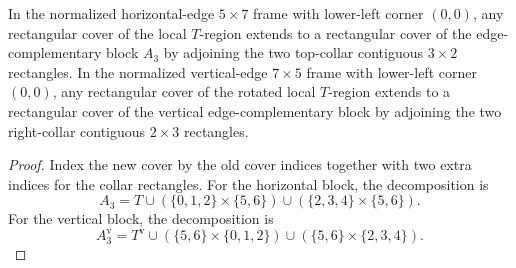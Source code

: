\begin{lemma}%
    \label{lem:peps_normalSquareEdgeComplementRegion_coverOfT}
    \leanok
    In the normalized horizontal-edge $5\times7$ frame with lower-left corner
    $(0,0)$, any rectangular cover of the local $T$-region extends to a
    rectangular cover of the edge-complementary block $A_3$ by adjoining the
    two top-collar contiguous $3\times2$ rectangles. In the normalized
    vertical-edge $7\times5$ frame with lower-left corner $(0,0)$, any
    rectangular cover of the rotated local $T$-region extends to a rectangular
    cover of the vertical edge-complementary block by adjoining the two
    right-collar contiguous $2\times3$ rectangles.
\end{lemma}
\begin{proof}\leanok
    Index the new cover by the old cover indices together with two extra
    indices for the collar rectangles. For the horizontal block, the
    decomposition is
    \[
        A_3 =
        T \cup (\{0,1,2\}\times\{5,6\})
        \cup (\{2,3,4\}\times\{5,6\}).
    \]
    For the vertical block, the decomposition is
    \[
        A_3^{\mathrm v} =
        T^{\mathrm v} \cup (\{5,6\}\times\{0,1,2\})
        \cup (\{5,6\}\times\{2,3,4\}).
    \]
\end{proof}

